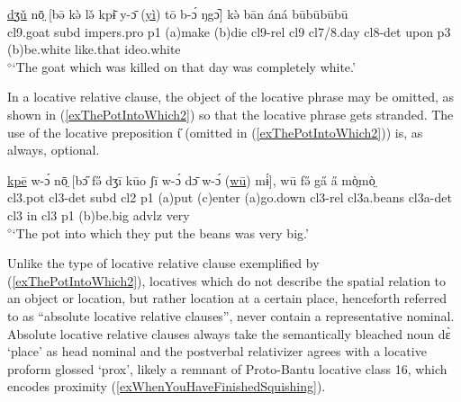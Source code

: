 \documentclass[10pt,twoside]{article}
\def\ci#1{{\ipaFont #1}}
\newcommand{\gl}[1]{`#1'}
\def\VSP{\vspace{0pt}}
\newcommand{\cl}[1]{{\sc cl#1}}
\newcommand{\pref}[1]{(\ref{#1})}
\def\elicited{$^\diamond$}
\def\ih{ɩ}
\newcommand{\comment}[1]{\textcolor{blue}{\emph{#1}}}
\begin{document}
\begin{exe} 
	\ex \label{exGoatTheyKilled2ResPro}	

		\gll	\uline{dʒǔ} nō̤ [bə̄ kə̀ lə̌ kpɨ̄ y-ɔ̄ (\uline{yì}) tō b-ɔ́ ŋgɔ᷆] kə̀ bān áná būbūbūbū			\\
			\cl9.goat {\sc subd} {\sc impers.pro} {\sc p1} ({\sc a})make ({\sc b})die \cl9-{\sc rel} \cl9  \cl7/8.day \cl8-{\sc det} upon {\sc p3} ({\sc b})be.white like.that {\sc ideo}.white		\\
		\glt \VSP \elicited \gl{The goat which was killed on that day was completely white.}
\end{exe}%

In a locative relative clause, the object of the locative phrase may be omitted, as 
shown in \pref{exThePotIntoWhich2} so that the locative phrase 
gets stranded. The use of the locative preposition \ci{\H\ih} (omitted in \pref{exThePotIntoWhich2}) is, as always, optional.

\begin{exe}
	\ex \label{exThePotIntoWhich2}	
		\gll \uline{kpē} w-ɔ́ nō̤ [bɔ̋ fə̋ dʒī kūo ʃī w-ɔ́ dɔ̄ w-ɔ́ (\uline{wū}) mɨ́], wū fə̋ ga̋ a̋ mò̤mò̤	\\
		\cl3.pot \cl3-{\sc det} {\sc subd} \cl2  {\sc p1} ({\sc a})put ({\sc c})enter ({\sc a})go.down \cl3-{\sc rel} \cl3a.beans \cl3a-{\sc det} \cl3  in \cl3  {\sc p1} ({\sc b})be.big {\sc advlz} very 	\\
		\glt \VSP \elicited \gl{The pot into which they put the beans was very big.}
\end{exe}%

Unlike the type of locative relative clause exemplified by \pref{exThePotIntoWhich2}, locatives which do not describe the spatial relation to an object or location, but rather location at a certain place, henceforth referred to as ``absolute locative 
relative clauses'', never contain a representative nominal. Absolute locative 
relative clauses always take the semantically bleached noun \ci{dɛ̀} \gl{place} as head nominal and the 
postverbal relativizer agrees with a locative proform glossed \gl{{\sc prox}}, likely
a remnant of Proto-Bantu locative class 16, which 
encodes proximity \pref{exWhenYouHaveFinishedSquishing}. 
\end{document}
